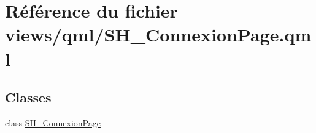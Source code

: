 \hypertarget{SH__ConnexionPage_8qml}{\section{Référence du fichier views/qml/\-S\-H\-\_\-\-Connexion\-Page.qml}
\label{SH__ConnexionPage_8qml}
}
\subsection*{Classes}
\begin{DoxyCompactItemize}
\item 
class \hyperlink{classSH__ConnexionPage}{S\-H\-\_\-\-Connexion\-Page}
\end{DoxyCompactItemize}
